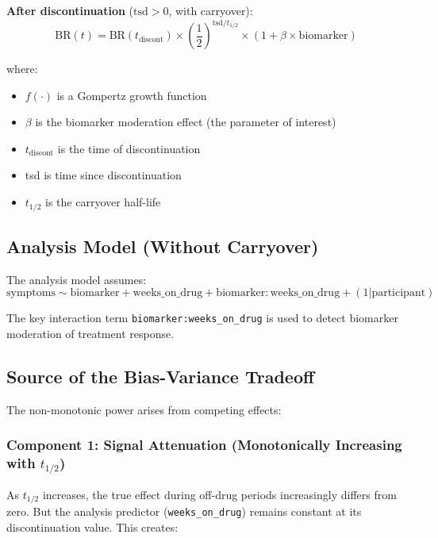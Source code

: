 \documentclass[11pt,a4paper]{article}
\begin{document}
\textbf{After discontinuation} ($\text{tsd} > 0$, with carryover):
\begin{equation}
\text{BR}(t) = \text{BR}(t_{\text{discont}}) \times \left(\frac{1}{2}\right)^{\text{tsd} / t_{1/2}} \times (1 + \beta \times \text{biomarker})
\end{equation}

where:
\begin{itemize}
    \item $f(\cdot)$ is a Gompertz growth function
    \item $\beta$ is the biomarker moderation effect (the parameter of interest)
    \item $t_{\text{discont}}$ is the time of discontinuation
    \item tsd is time since discontinuation
    \item $t_{1/2}$ is the carryover half-life
\end{itemize}

\subsection{Analysis Model (Without Carryover)}

The analysis model assumes:
\begin{equation}
\text{symptoms} \sim \text{biomarker} + \text{weeks\_on\_drug} + \text{biomarker}:\text{weeks\_on\_drug} + (1|\text{participant})
\end{equation}

The key interaction term \texttt{biomarker:weeks\_on\_drug} is used to detect biomarker
moderation of treatment response.

\subsection{Source of the Bias-Variance Tradeoff}

The non-monotonic power arises from competing effects:

\subsubsection{Component 1: Signal Attenuation (Monotonically Increasing with $t_{1/2}$)}

As $t_{1/2}$ increases, the true effect during off-drug periods increasingly differs
from zero. But the analysis predictor (\texttt{weeks\_on\_drug}) remains constant at its
discontinuation value. This creates:
\end{document}
